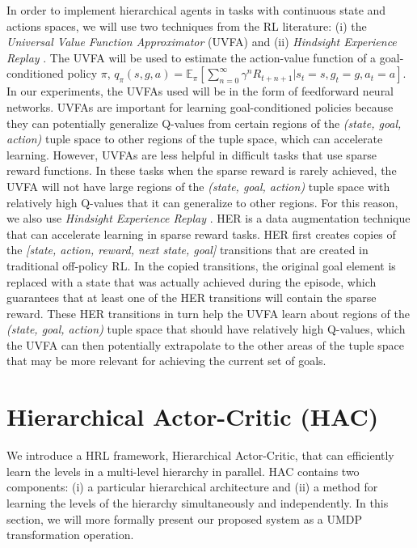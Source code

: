 \documentclass{article} %
\begin{document}
In order to implement hierarchical agents in tasks with continuous state and actions spaces, we will use two techniques from the RL literature: (i) the \textit{Universal Value Function Approximator} (UVFA) \citep{schaul15} and (ii) \textit{Hindsight Experience Replay} \citep{Andrychowicz2017HindsightER}. The UVFA  will be used to estimate the action-value function of a goal-conditioned policy $\pi$, $q_{\pi}(s,g,a)=\mathbb{E}_{\pi}[\sum\nolimits_{n=0}^\infty \gamma^n R_{t+n+1}|s_t=s,g_t=g,a_t=a]$.  In our experiments, the UVFAs used will be in the form of feedforward neural networks.  UVFAs are important for learning goal-conditioned policies because they can potentially generalize Q-values from certain regions of the \textit{(state, goal, action)} tuple space to other regions of the tuple space, which can accelerate learning.  However, UVFAs are less helpful in difficult tasks that use sparse reward functions.  In these tasks when the sparse reward is rarely achieved, the UVFA will not have large regions of the \textit{(state, goal, action)} tuple space with relatively high Q-values that it can generalize to other regions.  For this reason, we also use \textit{Hindsight Experience Replay} \citep{Andrychowicz2017HindsightER}.  HER is a data augmentation technique that can accelerate learning in sparse reward tasks.  HER first creates copies of the \textit{[state, action, reward, next state, goal]} transitions that are created in traditional off-policy RL.  In the copied transitions, the original goal element is replaced with a state that was actually achieved during the episode, which guarantees that at least one of the HER transitions will contain the sparse reward.  These HER transitions in turn help the UVFA learn about regions of the \textit{(state, goal, action)} tuple space that should have relatively high Q-values, which the UVFA can then potentially extrapolate to the other areas of the tuple space that may be more relevant for achieving the current set of goals.            


\section{Hierarchical Actor-Critic (HAC)}

We introduce a HRL framework, Hierarchical Actor-Critic, that can efficiently learn the levels in a multi-level hierarchy in parallel.  HAC contains two components: (i) a particular hierarchical architecture and (ii) a method for learning the levels of the hierarchy simultaneously and independently.  In this section, we will more formally present our proposed system as a UMDP transformation operation.  
\end{document}
